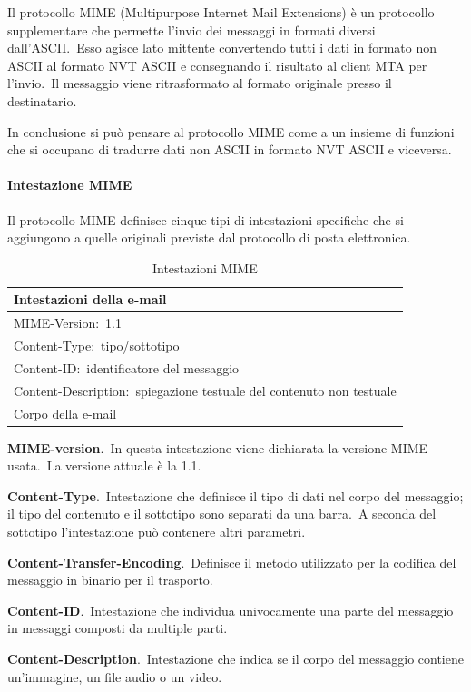 Il protocollo MIME (Multipurpose Internet Mail Extensions) è un protocollo supplementare che permette l'invio dei messaggi in formati diversi dall'ASCII.\
Esso agisce lato mittente convertendo tutti i dati in formato non ASCII al formato NVT ASCII e consegnando il risultato al client MTA per l'invio.\
Il messaggio viene ritrasformato al formato originale presso il destinatario.

In conclusione si può pensare al protocollo MIME come a un insieme di funzioni che si occupano di tradurre dati non ASCII in formato NVT ASCII e viceversa.

\paragraph{Intestazione MIME}

Il protocollo MIME definisce cinque tipi di intestazioni specifiche che si aggiungono a quelle originali previste dal protocollo di posta elettronica.

\begin{table}[H]
    \centering
    \begin{tabular}{|p{13cm}|}
        \hline
        Intestazioni della e-mail                                             \\
        \hline
        MIME-Version:\ 1.1                                                    \\
        Content-Type:\ tipo/sottotipo                                         \\
        Content-ID:\ identificatore del messaggio                             \\
        Content-Description:\ spiegazione testuale del contenuto non testuale \\
        \hline
        Corpo della e-mail                                                    \\
        \hline
    \end{tabular}
    \caption*{Intestazioni MIME}
\end{table}

\begin{flushleft}
    \textbf{MIME-version}.\
    In questa intestazione viene dichiarata la versione MIME usata.\
    La versione attuale è la 1.1.

    \textbf{Content-Type}.\
    Intestazione che definisce il tipo di dati nel corpo del messaggio; il tipo del contenuto e il sottotipo sono separati da una barra.\
    A seconda del sottotipo l'intestazione può contenere altri parametri.

    \textbf{Content-Transfer-Encoding}.\
    Definisce il metodo utilizzato per la codifica del messaggio in binario per il trasporto.

    \textbf{Content-ID}.\
    Intestazione che individua univocamente una parte del messaggio in messaggi composti da multiple parti.

    \textbf{Content-Description}.\
    Intestazione che indica se il corpo del messaggio contiene un'immagine, un file audio o un video.
\end{flushleft}


